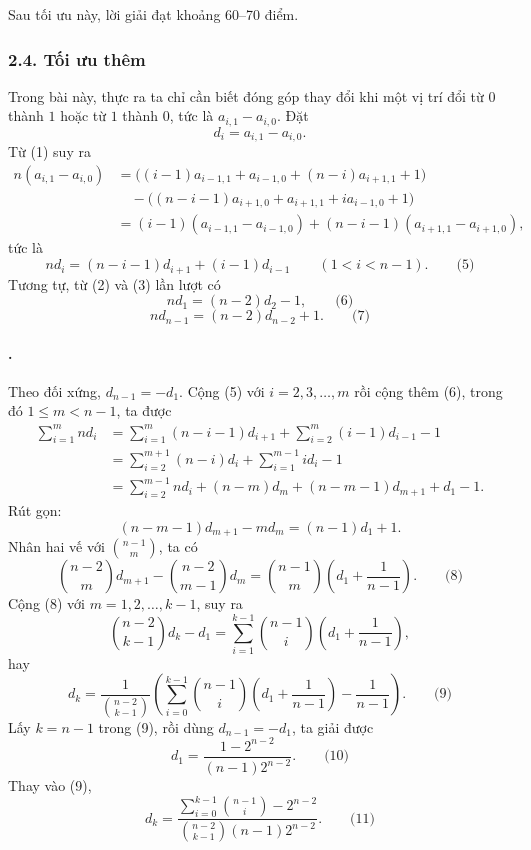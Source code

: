 \documentclass[11pt]{article}
\begin{document}
Sau tối ưu này, lời giải đạt khoảng 60--70 điểm.

\subsubsection*{2.4. Tối ưu thêm}

Trong bài này, thực ra ta chỉ cần biết đóng góp thay đổi khi một vị trí đổi từ
\(0\) thành \(1\) hoặc từ \(1\) thành \(0\), tức là \(a_{i,1}-a_{i,0}\). Đặt
\[
  d_i=a_{i,1}-a_{i,0}.
\]
Từ (1) suy ra
\[
\begin{aligned}
n(a_{i,1}-a_{i,0})
&=\bigl((i-1)a_{i-1,1}+a_{i-1,0}+(n-i)a_{i+1,1}+1\bigr)\\
&\quad-\bigl((n-i-1)a_{i+1,0}+a_{i+1,1}+ia_{i-1,0}+1\bigr)\\
&=(i-1)(a_{i-1,1}-a_{i-1,0})
 +(n-i-1)(a_{i+1,1}-a_{i+1,0}),
\end{aligned}
\]
tức là
\[
  nd_i=(n-i-1)d_{i+1}+(i-1)d_{i-1}\qquad (1<i<n-1). \qquad\text{(5)}
\]
Tương tự, từ (2) và (3) lần lượt có
\[
  nd_1=(n-2)d_2-1, \qquad\text{(6)}
\]
\[
  nd_{n-1}=(n-2)d_{n-2}+1. \qquad\text{(7)}
\]

\paragraph{.}
Theo đối xứng, \(d_{n-1}=-d_1\). Cộng (5) với \(i=2,3,\ldots,m\) rồi cộng thêm
(6), trong đó \(1\le m<n-1\), ta được
\[
\begin{aligned}
\sum_{i=1}^{m}nd_i
&=\sum_{i=1}^{m}(n-i-1)d_{i+1}+\sum_{i=2}^{m}(i-1)d_{i-1}-1\\
&=\sum_{i=2}^{m+1}(n-i)d_i+\sum_{i=1}^{m-1}id_i-1\\
&=\sum_{i=2}^{m-1}nd_i+(n-m)d_m+(n-m-1)d_{m+1}+d_1-1.
\end{aligned}
\]
Rút gọn:
\[
  (n-m-1)d_{m+1}-md_m=(n-1)d_1+1.
\]
Nhân hai vế với \(\binom{n-1}{m}\), ta có
\[
  \binom{n-2}{m}d_{m+1}-\binom{n-2}{m-1}d_m
  =\binom{n-1}{m}\left(d_1+\frac1{n-1}\right). \qquad\text{(8)}
\]
Cộng (8) với \(m=1,2,\ldots,k-1\), suy ra
\[
  \binom{n-2}{k-1}d_k-d_1
  =\sum_{i=1}^{k-1}\binom{n-1}{i}
   \left(d_1+\frac1{n-1}\right),
\]
hay
\[
  d_k=\frac{1}{\binom{n-2}{k-1}}
  \left(\sum_{i=0}^{k-1}\binom{n-1}{i}
  \left(d_1+\frac1{n-1}\right)-\frac1{n-1}\right). \qquad\text{(9)}
\]
Lấy \(k=n-1\) trong (9), rồi dùng \(d_{n-1}=-d_1\), ta giải được
\[
  d_1=\frac{1-2^{n-2}}{(n-1)2^{n-2}}. \qquad\text{(10)}
\]
Thay vào (9),
\[
  d_k=
  \frac{\sum_{i=0}^{k-1}\binom{n-1}{i}-2^{n-2}}
       {\binom{n-2}{k-1}(n-1)2^{n-2}}. \qquad\text{(11)}
\]
\end{document}

